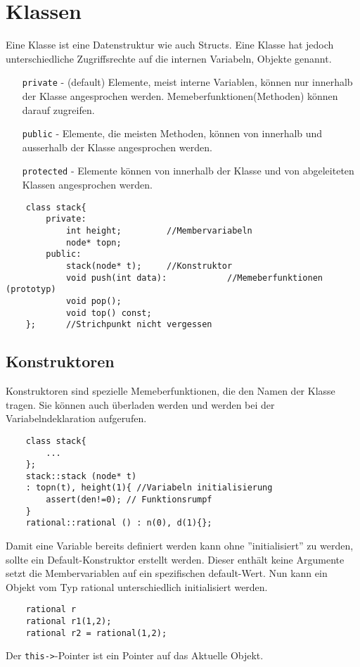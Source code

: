 \section{Klassen}
Eine Klasse ist eine Datenstruktur wie auch Structs. Eine Klasse hat jedoch unterschiedliche Zugriffsrechte auf die internen Variabeln, Objekte genannt.
\begin{itemize}
	\item[\texttt{private}] - (default) Elemente, meist interne Variablen, können nur innerhalb der Klasse angesprochen werden. Memeberfunktionen(Methoden) können darauf zugreifen. 
	\item[\texttt{public}] - Elemente, die meisten Methoden, können von innerhalb und ausserhalb der Klasse angesprochen werden.
	\item[\texttt{protected}] - Elemente können von innerhalb der Klasse und von abgeleiteten Klassen angesprochen werden.
\end{itemize}
\begin{lstlisting}
	class stack{
		private:
			int height;			//Membervariabeln
			node* topn;					
		public:
			stack(node* t);		//Konstruktor
			void push(int data):			//Memeberfunktionen (prototyp)
			void pop();
			void top() const;
	}; 		//Strichpunkt nicht vergessen
\end{lstlisting}
\subsection{Konstruktoren}
Konstruktoren sind spezielle Memeberfunktionen, die den Namen der Klasse tragen. Sie können auch überladen werden und werden bei der Variabelndeklaration aufgerufen.
\begin{lstlisting}
	class stack{
		...
	};
	stack::stack (node* t)
	: topn(t), height(1){ //Variabeln initialisierung
		assert(den!=0); // Funktionsrumpf
	}
	rational::rational () : n(0), d(1){};
\end{lstlisting}
Damit eine Variable bereits definiert werden kann ohne ''initialisiert'' zu werden, sollte ein Default-Konstruktor erstellt werden. Dieser enthält keine Argumente setzt die Membervariablen auf ein spezifischen default-Wert. Nun kann ein Objekt vom Typ rational unterschiedlich initialisiert werden. 
\begin{lstlisting}
	rational r
	rational r1(1,2);
	rational r2 = rational(1,2);
\end{lstlisting}
Der \texttt{this->}-Pointer ist ein Pointer auf das Aktuelle Objekt.

